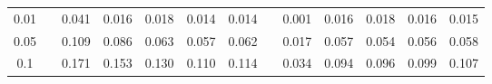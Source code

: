 % 
\begin{tabular}{ccccccccccccc}
  \hline
  \hline
0.01 &  & 0.041 & 0.016 & 0.018 & 0.014 & 0.014 &  & 0.001 & 0.016 & 0.018 & 0.016 & 0.015 \\ 
  0.05 &  & 0.109 & 0.086 & 0.063 & 0.057 & 0.062 &  & 0.017 & 0.057 & 0.054 & 0.056 & 0.058 \\ 
  0.1 &  & 0.171 & 0.153 & 0.130 & 0.110 & 0.114 &  & 0.034 & 0.094 & 0.096 & 0.099 & 0.107 \\ 
   \hline
\end{tabular}
